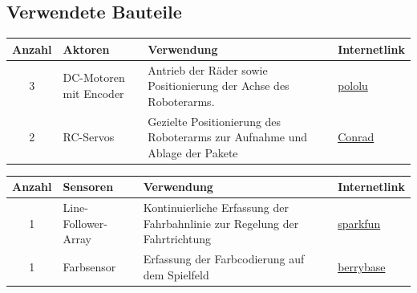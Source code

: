 \documentclass[11pt,a4paper]{article}
\renewcommand{\arraystretch}{1.7}
\begin{document}
	\subsection{Verwendete Bauteile}
	
	\begin{table}[H]
		\centering
		\renewcommand{\arraystretch}{1.2}
		\begin{tabularx}{\textwidth}{|c|l|X|p{2.5cm}|}
			\hline
			\textbf{Anzahl} & \textbf{Aktoren} & \textbf{Verwendung} & \textbf{Internetlink} 
			\\
			\hline
			3& %
			DC-Motoren mit Encoder & %
			Antrieb der Räder sowie Positionierung der Achse des Roboterarms.& %
			\href{https://www.pololu.com/category/167/20d-metal-gearmotors}{pololu} \\
			\hline
			2& %
			RC-Servos& %
			Gezielte Positionierung des Roboterarms zur Aufnahme und Ablage der Pakete& %
			\href{https://www.conrad.ch/de/p/reely-standard-servo-cys-s0090-analog-servo-getriebe-material-metall-stecksystem-jr-2203091.html}{Conrad} \\
			\hline
			
		\end{tabularx}
	\end{table}

	\begin{table}[H]
		\centering
		\renewcommand{\arraystretch}{1.2}
		\begin{tabularx}{\textwidth}{|c|l|X|p{2.5cm}|}
			\hline
			\textbf{Anzahl} & \textbf{Sensoren} & \textbf{Verwendung} & \textbf{Internetlink} 
			\\
			\hline
			1& %
			Line-Follower-Array& %
			Kontinuierliche Erfassung der Fahrbahnlinie zur Regelung der Fahrtrichtung& %
			\href{https://www.sparkfun.com/sparkfun-line-follower-array.html}{sparkfun} \\
			\hline
			1& %
			Farbsensor& %
			Erfassung der Farbcodierung auf dem Spielfeld& %
			\href{https://www.berrybase.ch/tcs230-tcs3200-farbsensor-modul}{berrybase} \\
			\hline
		\end{tabularx}
	\end{table}
\end{document}
